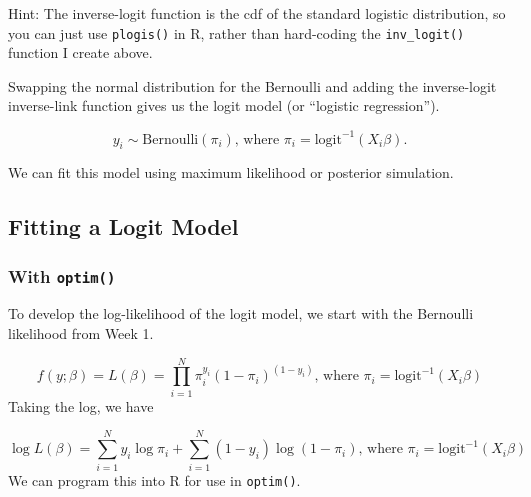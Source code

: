 \documentclass[
]{book}
\begin{document}
Hint: The inverse-logit function is the cdf of the standard logistic distribution, so you can just use \texttt{plogis()} in R, rather than hard-coding the \texttt{inv\_logit()} function I create above.

Swapping the normal distribution for the Bernoulli and adding the inverse-logit inverse-link function gives us the logit model (or ``logistic regression'').

\[
y_i \sim \text{Bernoulli}(\pi_i)\text{, where } \pi_i = \text{logit}^{-1}(X_i\beta).
\]

We can fit this model using maximum likelihood or posterior simulation.

\hypertarget{fitting-a-logit-model}{%
\subsection{Fitting a Logit Model}\label{fitting-a-logit-model}}

\hypertarget{with-optim}{%
\subsubsection{\texorpdfstring{With \texttt{optim()}}{With optim()}}\label{with-optim}}

To develop the log-likelihood of the logit model, we start with the Bernoulli likelihood from Week 1.

\[
f(y; \beta) = L(\beta) = \prod_{i = 1}^{N}\pi_i^{y_i} (1 - \pi_i)^{(1 - y_i)}\text{, where } \pi_i = \text{logit}^{-1}(X_i\beta)
\]
Taking the log, we have

\[
\log L(\beta) = \sum_{i = 1}^{N} y_i \log \pi_i +  \sum_{i = 1}^{N}(1 - y_i) \log(1 - \pi_i)\text{, where } \pi_i = \text{logit}^{-1}(X_i\beta)
\]
We can program this into R for use in \texttt{optim()}.
\end{document}
